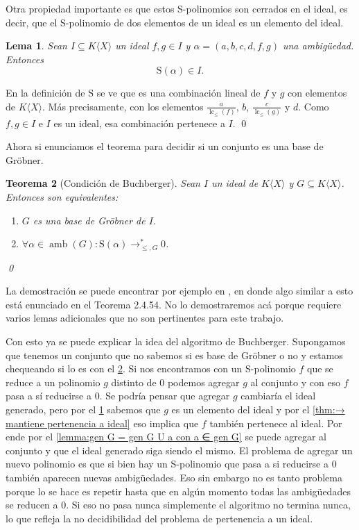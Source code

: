 \documentclass[12pt]{report}
\theoremstyle{customstyle}
\newtheorem{theorem}{Teorema}[chapter]
\newtheorem{lemma}[theorem]{Lema}
\renewenvironment{proof}[1][\proofname]{{\noindent \bfseries #1: }}{\qed} %
\theoremstyle{factstyle}
\DeclareMathOperator{\lc}{lc}
\DeclareMathOperator{\amb}{amb}
\renewcommand{\S}{\text{S}}
\begin{document}
Otra propiedad importante es que estos S-polinomios son cerrados en el ideal, es decir, que el S-polinomio de dos elementos de un ideal es un elemento del ideal.

\begin{lemma}\label{lemma:S es cerrado en ideal}
  Sean $I ⊆ K⟨X⟩$ un ideal $f, g ∈ I$ y $α = (a, b, c, d, f, g)$ una ambigüedad. Entonces
  \[ \S(α) ∈ I \text{.}\]
\end{lemma}
\begin{proof}
  En la definición de $\S$ se ve que es una combinación lineal de $f$ y $g$ con elementos de $K⟨X⟩$. Más precisamente, con los elementos $\frac{a}{\lc_≤{(f)}}$, $b$, $\frac{c}{\lc_≤{(g)}}$ y $d$. Como $f, g ∈ I$ e $I$ es un ideal, esa combinación pertenece a $I$.
\end{proof}

Ahora si enunciamos el teorema para decidir si un conjunto es una base de Gröbner.

\begin{theorem}[Condición de Buchberger]\label{thm:condición de Buchberger}
  Sean $I$ un ideal de $K⟨X⟩$ y $G ⊆ K⟨X⟩$. Entonces son equivalentes:
  \begin{enumerate}
    \item $G$ es una base de Gröbner de $I$.
    \item $∀α ∈ \amb(G) : \S(α) →^*_{≤, G} 0$.
  \end{enumerate}
  \qed
\end{theorem}

La demostración se puede encontrar por ejemplo en \cite{phdthesis:Hof23}, en donde algo similar a esto está enunciado en el Teorema 2.4.54. No lo demostraremos acá porque requiere varios lemas adicionales que no son pertinentes para este trabajo.

Con esto ya se puede explicar la idea del algoritmo de Buchberger. Supongamos que tenemos un conjunto que no sabemos si es base de Gröbner o no y estamos chequeando si lo es con el \cref{thm:condición de Buchberger}. Si nos encontramos con un S-polinomio $f$ que se reduce a un polinomio $g$ distinto de $0$ podemos agregar $g$ al conjunto y con eso $f$ pasa a sí reducirse a $0$. Se podría pensar que agregar $g$ cambiaría el ideal generado, pero por el \cref{lemma:S es cerrado en ideal} sabemos que $g$ es un elemento del ideal y por el \cref{thm:→ mantiene pertenencia a ideal} eso implica que $f$ también pertenece al ideal. Por ende por el \cref{lemma:gen G = gen G U a con a ∈ gen G} se puede agregar al conjunto y que el ideal generado siga siendo el mismo. El problema de agregar un nuevo polinomio es que si bien hay un S-polinomio que pasa a si reducirse a $0$ también aparecen nuevas ambigüedades. Eso sin embargo no es tanto problema porque lo se hace es repetir hasta que en algún momento todas las ambigüedades se reducen a $0$. Si eso no pasa nunca simplemente el algoritmo no termina nunca, lo que refleja la no decidibilidad del problema de pertenencia a un ideal.
\end{document}
